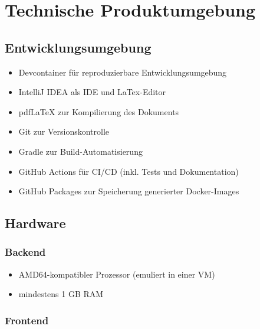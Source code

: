 

\chapter{Technische Produktumgebung}
\label{chap:tech_env}

\section{Entwicklungsumgebung}

\begin{itemize}
    \item Devcontainer für reproduzierbare Entwicklungsumgebung
    \item IntelliJ IDEA als IDE und LaTex-Editor
    \item pdfLaTeX zur Kompilierung des Dokuments
    \item Git zur Versionskontrolle
    \item Gradle zur Build-Automatisierung
    \item GitHub Actions für CI/CD (inkl. Tests und Dokumentation)
    \item GitHub Packages zur Speicherung generierter Docker-Images
\end{itemize}

\section{Hardware}

\subsection{Backend}

\begin{itemize}
    \item AMD64-kompatibler Prozessor (emuliert in einer VM)
    \item mindestens 1 GB RAM
\end{itemize}

\subsection{Frontend}

